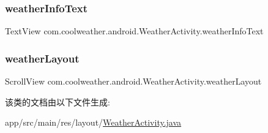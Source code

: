 \subsubsection{\texorpdfstring{weatherInfoText}{weatherInfoText}}
{\footnotesize\ttfamily Text\+View com.\+coolweather.\+android.\+Weather\+Activity.\+weather\+Info\+Text\hspace{0.3cm}{\ttfamily [private]}}

\mbox{\label{classcom_1_1coolweather_1_1android_1_1_weather_activity_a6968c8916501dd436af670fc675265d9}} 
\subsubsection{\texorpdfstring{weatherLayout}{weatherLayout}}
{\footnotesize\ttfamily Scroll\+View com.\+coolweather.\+android.\+Weather\+Activity.\+weather\+Layout\hspace{0.3cm}{\ttfamily [private]}}



该类的文档由以下文件生成\+:\begin{DoxyCompactItemize}
\item 
app/src/main/res/layout/\mbox{\hyperlink{res_2layout_2_weather_activity_8java}{Weather\+Activity.\+java}}\end{DoxyCompactItemize}
